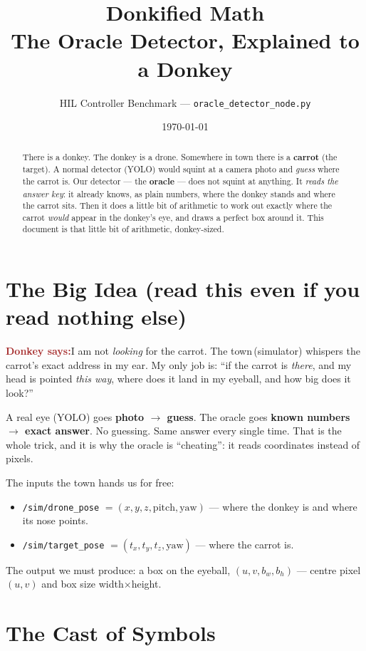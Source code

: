 \documentclass[11pt]{article}
\title{\textbf{Donkified Math}\\[4pt]
       \large The Oracle Detector, Explained to a Donkey}
\author{HIL Controller Benchmark --- \texttt{oracle\_detector\_node.py}}
\date{\today}
\newcommand{\donkey}[1]{%
  \begin{mdframed}[backgroundcolor=brown!8, linecolor=brown!50, linewidth=1pt,
                   roundcorner=6pt, skipabove=8pt, skipbelow=8pt]
  \textbf{\textcolor{brown}{\large Donkey says:}}\quad #1
  \end{mdframed}}
\begin{document}
\maketitle

\begin{abstract}
\noindent
There is a donkey. The donkey is a drone. Somewhere in town there is a
\textbf{carrot} (the target). A normal detector (YOLO) would squint at a
camera photo and \emph{guess} where the carrot is. Our detector --- the
\textbf{oracle} --- does not squint at anything. It \emph{reads the answer key}:
it already knows, as plain numbers, where the donkey stands and where the carrot
sits. Then it does a little bit of arithmetic to work out exactly where the
carrot \emph{would} appear in the donkey's eye, and draws a perfect box around
it. This document is that little bit of arithmetic, donkey-sized.
\end{abstract}

\section{The Big Idea (read this even if you read nothing else)}

\donkey{I am not \emph{looking} for the carrot. The town\,(simulator) whispers
the carrot's exact address in my ear. My only job is: ``if the carrot is
\emph{there}, and my head is pointed \emph{this way}, where does it land in my
eyeball, and how big does it look?''}

A real eye (YOLO) goes \textbf{photo $\to$ guess}. The oracle goes
\textbf{known numbers $\to$ exact answer}. No guessing. Same answer every single
time. That is the whole trick, and it is why the oracle is ``cheating'': it
reads coordinates instead of pixels.

The inputs the town hands us for free:
\begin{itemize}[nosep]
  \item \texttt{/sim/drone\_pose} $=(x,y,z,\text{pitch},\text{yaw})$ --- where the donkey is and where its nose points.
  \item \texttt{/sim/target\_pose} $=(t_x,t_y,t_z,\text{yaw})$ --- where the carrot is.
\end{itemize}
The output we must produce: a box on the eyeball, $(u,v,b_w,b_h)$ ---
centre pixel $(u,v)$ and box size width$\times$height.

\section{The Cast of Symbols}
\end{document}

